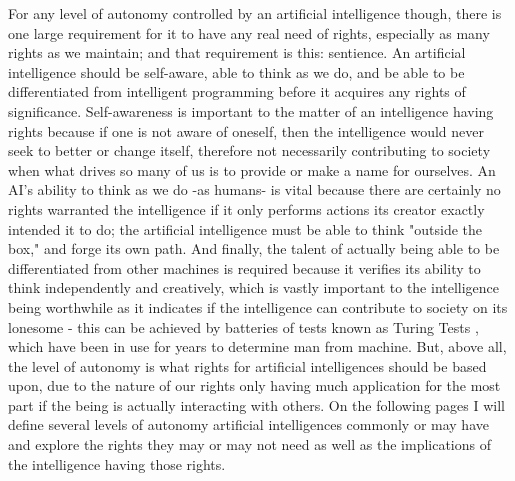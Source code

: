 For any level of autonomy controlled by an artificial intelligence though, there is one large requirement for it to have any real need of rights, especially as many rights as we maintain; and that requirement is this: sentience. An artificial intelligence should be self-aware, able to think as we do, and be able to be differentiated from intelligent programming before it acquires any rights of significance. Self-awareness is important to the matter of an intelligence having rights because if one is not aware of oneself, then the intelligence would never seek to better or change itself, therefore not necessarily contributing to society when what drives so many of us is to provide or make a name for ourselves. An AI's ability to think as we do -as humans- is vital because there are certainly no rights warranted the intelligence if it only performs actions its creator exactly intended it to do; the artificial intelligence must be able to think "outside the box," and forge its own path. And finally, the talent of actually being able to be differentiated from other machines is required because it verifies its ability to think independently and creatively, which is vastly important to the intelligence being worthwhile as it indicates if the intelligence can contribute to society on its lonesome - this can be achieved by batteries of tests known as Turing Tests \cite{sep-turing-test}, which have been in use for years to determine man from machine. But, above all, the level of autonomy is what rights for artificial intelligences should be based upon, due to the nature of our rights only having much application for the most part if the being is actually interacting with others. On the following pages I will define several levels of autonomy artificial intelligences commonly or may have and explore the rights they may or may not need as well as the implications of the intelligence having those rights.